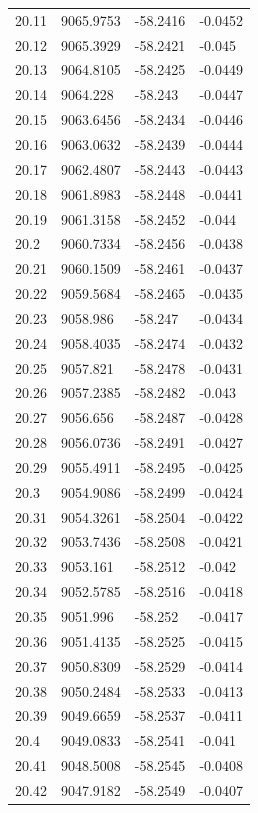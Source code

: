 \begin{table}[H]
\begin{tabular}{llll}
20.11 & 9065.9753 & -58.2416 & -0.0452 \\
20.12 & 9065.3929 & -58.2421 & -0.045 \\
20.13 & 9064.8105 & -58.2425 & -0.0449 \\
20.14 & 9064.228 & -58.243 & -0.0447 \\
20.15 & 9063.6456 & -58.2434 & -0.0446 \\
20.16 & 9063.0632 & -58.2439 & -0.0444 \\
20.17 & 9062.4807 & -58.2443 & -0.0443 \\
20.18 & 9061.8983 & -58.2448 & -0.0441 \\
20.19 & 9061.3158 & -58.2452 & -0.044 \\
20.2 & 9060.7334 & -58.2456 & -0.0438 \\
20.21 & 9060.1509 & -58.2461 & -0.0437 \\
20.22 & 9059.5684 & -58.2465 & -0.0435 \\
20.23 & 9058.986 & -58.247 & -0.0434 \\
20.24 & 9058.4035 & -58.2474 & -0.0432 \\
20.25 & 9057.821 & -58.2478 & -0.0431 \\
20.26 & 9057.2385 & -58.2482 & -0.043 \\
20.27 & 9056.656 & -58.2487 & -0.0428 \\
20.28 & 9056.0736 & -58.2491 & -0.0427 \\
20.29 & 9055.4911 & -58.2495 & -0.0425 \\
20.3 & 9054.9086 & -58.2499 & -0.0424 \\
20.31 & 9054.3261 & -58.2504 & -0.0422 \\
20.32 & 9053.7436 & -58.2508 & -0.0421 \\
20.33 & 9053.161 & -58.2512 & -0.042 \\
20.34 & 9052.5785 & -58.2516 & -0.0418 \\
20.35 & 9051.996 & -58.252 & -0.0417 \\
20.36 & 9051.4135 & -58.2525 & -0.0415 \\
20.37 & 9050.8309 & -58.2529 & -0.0414 \\
20.38 & 9050.2484 & -58.2533 & -0.0413 \\
20.39 & 9049.6659 & -58.2537 & -0.0411 \\
20.4 & 9049.0833 & -58.2541 & -0.041 \\
20.41 & 9048.5008 & -58.2545 & -0.0408 \\
20.42 & 9047.9182 & -58.2549 & -0.0407 \\

\end{tabular}
\end{table}
